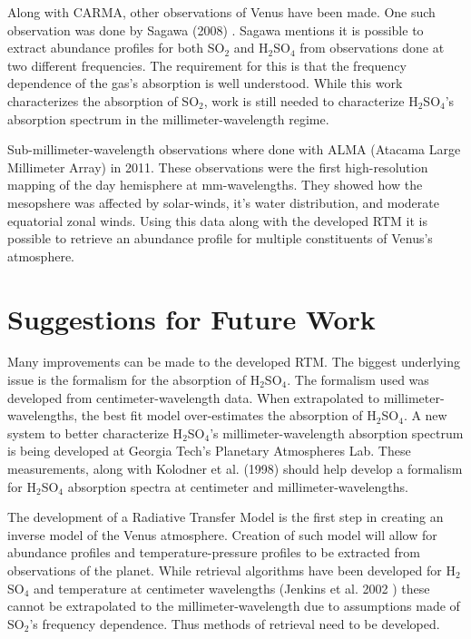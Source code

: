 Along with CARMA, other observations of Venus have been made. One such observation was done by Sagawa (2008) \cite{Sagawa-2008}. Sagawa mentions it is possible to extract abundance profiles for both SO$_2$ and H$_2$SO$_4$ from observations done at two different frequencies. The requirement for this is that the frequency dependence of the gas's absorption is well understood. While this work characterizes the absorption of SO$_2$, work is still needed to characterize H$_2$SO$_4$'s absorption spectrum in the millimeter-wavelength regime. 

Sub-millimeter-wavelength observations where done with ALMA (Atacama Large Millimeter Array) in 2011. These observations were the first high-resolution mapping of the day hemisphere at mm-wavelengths. They showed how the mesopshere was affected by solar-winds, it's water distribution, and moderate equatorial zonal winds. Using this data along with the developed RTM it is possible to retrieve an abundance profile for multiple constituents of Venus's atmosphere.

\section{Suggestions for Future Work}
Many improvements can be made to the developed RTM. The biggest underlying issue is the formalism for the absorption of H$_2$SO$_4$. The formalism used was developed from centimeter-wavelength data. When extrapolated to millimeter-wavelengths, the best fit model over-estimates the absorption of H$_2$SO$_4$. A new system to better characterize H$_2$SO$_4$'s millimeter-wavelength absorption spectrum is being developed at Georgia Tech's Planetary Atmospheres Lab. These measurements, along with Kolodner et al. (1998) \cite{Kolodner-1998} should help develop a formalism for H$_2$SO$_4$ absorption spectra at centimeter and millimeter-wavelengths. 

The development of a Radiative Transfer Model is the first step in creating an inverse model of the Venus atmosphere. Creation of such model will allow for abundance profiles and temperature-pressure profiles to be extracted from observations of the planet. While retrieval algorithms have been developed for H$_2$SO$_4$ and temperature at centimeter wavelengths (Jenkins et al. 2002 \cite{Jenkins-2002}) these cannot be extrapolated to the millimeter-wavelength due to assumptions made of SO$_2$'s frequency dependence. Thus methods of retrieval need to be developed.